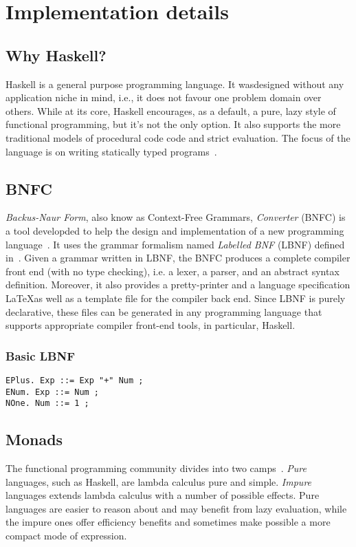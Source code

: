 \chapter{Implementation details}

\section{Why Haskell?}

Haskell is a general purpose programming language. It wasdesigned without any
application niche in mind, i.e., it does not favour one problem domain over
others. While at its core, Haskell encourages, as a default, a pure, lazy style of
functional programming, but it's not the only option. It also supports the more
traditional models of procedural code code and strict evaluation. The focus of
the language is on writing statically typed programs~\cite{rwhaskell}. 

\section{BNFC}
\textit{Backus-Naur Form}, also know as Context-Free Grammars,
\textit{Converter} (BNFC) is a tool developded to help the design and
implementation of a new programming language~\cite{bnfcsite}. 
It uses the grammar formalism named \textit{Labelled BNF} (LBNF) defined
in~\cite{bnfc}. Given a grammar written in LBNF, the BNFC produces a complete
compiler front end (with no type checking), i.e. a lexer, a parser, and an
abstract syntax definition. Moreover, it also provides a pretty-printer and a
language specification \LaTeX as well as a template file for the compiler back
end. Since LBNF is purely declarative, these files can be generated in any
programming language that supports appropriate compiler front-end tools, in
particular, Haskell.

\subsection{Basic LBNF}

\begin{verbatim}
EPlus. Exp ::= Exp "+" Num ;
ENum. Exp ::= Num ;
NOne. Num ::= 1 ;
\end{verbatim}

\section{Monads}

The functional programming community divides into two camps~\cite{monadswadler}.
\textit{Pure} languages, such as Haskell, are lambda calculus pure and simple.
\textit{Impure} languages extends lambda calculus with a number of possible
effects. Pure languages are easier to reason about and may benefit from lazy
evaluation, while the impure ones offer efficiency benefits and sometimes make
possible a more compact mode of expression. 

